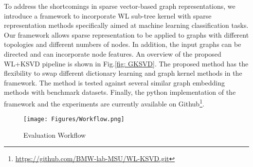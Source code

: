 To address the shortcomings in sparse vector-based graph representations, we introduce a framework to incorporate WL sub-tree kernel with sparse representation methods specifically aimed at machine learning classification tasks. Our framework allows sparse representation to be applied to graphs with different topologies and different numbers of nodes. In addition, the input graphs can be directed and can incorporate node features. An overview of the proposed WL+KSVD pipeline is shown in Fig.\ref{fig: GKSVD}. The proposed method has the flexibility to swap different dictionary learning and graph kernel methods in the framework. The method is tested against several similar graph embedding methods with benchmark datasets. Finally, the python implementation of the framework and the experiments are currently available on Github\footnote{\url{https://github.com/BMW-lab-MSU/WL-KSVD.git}}.

\begin{figure}[!t]
\centerline{\texttt{[image: Figures/Workflow.png]}}
\caption{Evaluation Workflow}\label{fig: workflow}
\end{figure}
